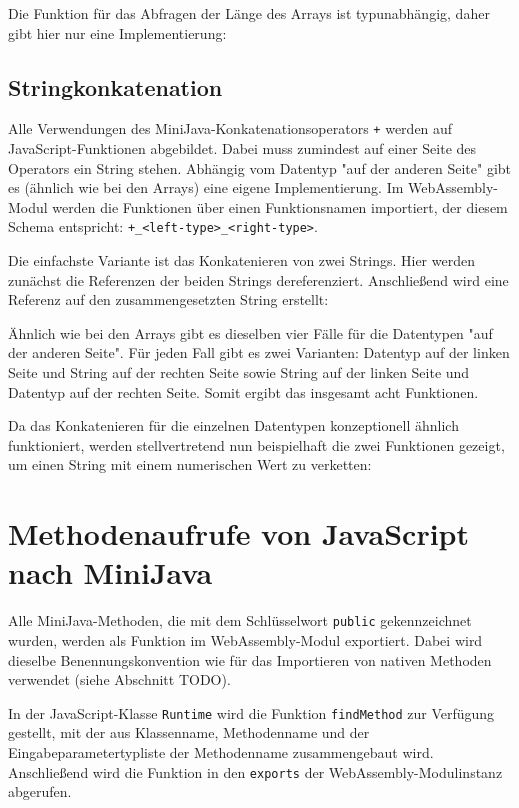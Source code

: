 Die Funktion für das Abfragen der Länge des Arrays ist typunabhängig, daher gibt hier nur eine Implementierung:



\subsection{Stringkonkatenation}

Alle Verwendungen des MiniJava-Konkatenationsoperators \lstinline{+} werden auf JavaScript-Funktionen abgebildet. Dabei muss zumindest auf einer Seite des Operators ein String stehen. Abhängig vom Datentyp "auf der anderen Seite" gibt es (ähnlich wie bei den Arrays) eine eigene Implementierung. Im WebAssembly-Modul werden die Funktionen über einen Funktionsnamen importiert, der diesem Schema entspricht: \lstinline{+_<left-type>_<right-type>}.

Die einfachste Variante ist das Konkatenieren von zwei Strings. Hier werden zunächst die Referenzen der beiden Strings dereferenziert. Anschließend wird eine Referenz auf den zusammengesetzten String erstellt:


Ähnlich wie bei den Arrays gibt es dieselben vier Fälle für die Datentypen "auf der anderen Seite". Für jeden Fall gibt es zwei Varianten: Datentyp auf der linken Seite und String auf der rechten Seite sowie String auf der linken Seite und Datentyp auf der rechten Seite. Somit ergibt das insgesamt acht Funktionen.

Da das Konkatenieren für die einzelnen Datentypen konzeptionell ähnlich funktioniert, werden stellvertretend nun beispielhaft die zwei Funktionen gezeigt, um einen String mit einem numerischen Wert zu verketten:


\section{Methodenaufrufe von JavaScript nach MiniJava}

Alle MiniJava-Methoden, die mit dem Schlüsselwort \lstinline{public} gekennzeichnet wurden, werden als Funktion im WebAssembly-Modul exportiert. Dabei wird dieselbe Benennungskonvention wie für das Importieren von nativen Methoden verwendet (siehe Abschnitt TODO).

In der JavaScript-Klasse \lstinline{Runtime} wird die Funktion \lstinline{findMethod} zur Verfügung gestellt, mit der aus Klassenname, Methodenname und der Eingabeparametertypliste der Methodenname zusammengebaut wird. Anschließend wird die Funktion in den \lstinline{exports} der WebAssembly-Modulinstanz abgerufen.

